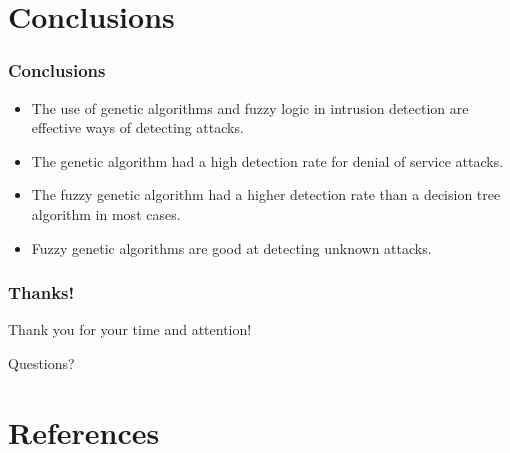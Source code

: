 \documentclass{beamer}
\newcommand{\linespace}{\vskip 0.25cm}
\begin{document}
\section[Conclusions]{Conclusions}

\begin{frame}
\frametitle{Conclusions}

\begin{itemize}
  \item The use of genetic algorithms and fuzzy logic in intrusion detection are effective ways of detecting attacks.
  \item The genetic algorithm had a high detection rate for denial of service attacks.
  \item The fuzzy genetic algorithm had a higher detection rate than a decision tree algorithm in most cases.
  \item Fuzzy genetic algorithms are good at detecting unknown attacks.
\end{itemize}


\end{frame}

\begin{frame}
	\frametitle{Thanks!}
	
	Thank you for your time and attention!
		
	\linespace
	\linespace
	
	\begin{center}
	{\huge Questions?}
	\end{center}
\end{frame}

\section*{References}
\end{document}
